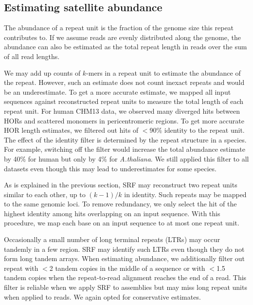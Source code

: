 \documentclass{bioinfo}
\newcommand{\revised}[1]{{\color{blue}#1}}
\begin{document}
\subsection{Estimating satellite abundance}

\revised{The abundance of a repeat unit is the fraction of the genome size this
repeat contributes to. If we assume reads are evenly distributed along the
genome, the abundance can also be estimated as the total repeat length in reads
over the sum of all read lengths.}

\revised{We may add up counts of $k$-mers in a repeat unit to estimate the
abundance of the repeat.  However, such an estimate does not count inexact
repeats and would be an underestimate. To get a more accurate estimate,} we
mapped all input sequences against reconstructed repeat units to measure the
total length of each repeat unit.
For human CHM13 data, we observed many diverged hits
between HORs and scattered monomers in pericentromeric regions. \revised{To get
more accurate HOR length estimates, we filtered out hits of $<$90\% identity to
the repeat unit.} The effect of the identity \revised{filter} is determined by
the repeat structure in a species.
For example, switching off the filter would increase the total abundance
estimate by 40\% for human but only by 4\% for \emph{A.thaliana}. We still
applied this filter to all datasets even though this may lead to underestimates
for some species.

\revised{As is explained in the previous section, SRF may reconstruct two
repeat units similar to each other, up to $(k-1)/k$ in identity. Such repeats
may be mapped to the same genomic loci.} To remove redundancy, we only select
the hit of the highest identity among hits overlapping on an input sequence.
With this procedure, we map each base on an input sequence to at most one
repeat unit.

Occasionally a small number of long terminal repeats (LTRs) may occur tandemly
in a few region. SRF may identify such LTRs even though they do not form long
tandem arrays. When estimating abundance, we additionally filter out repeat
with $<$2 tandem copies in the middle of a sequence or with $<$1.5 tandem
copies when the repeat-to-read alignment reaches the end of a read. This filter
is reliable when we apply SRF to assemblies but may miss long repeat units when
applied to reads. We again opted for conservative estimates.
\end{document}

